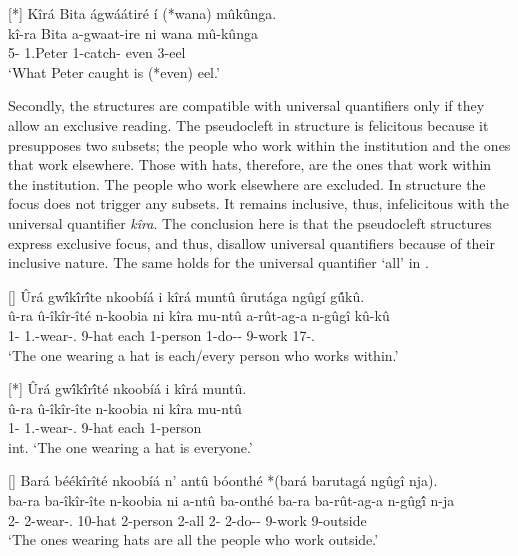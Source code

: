 \documentclass[output=paper]{langscibook}
\begin{document}
\ex
[*]{
\label{bkm:Ref111981565}
Kîrá Bita ágwáátiré í (*wana) mûkûnga.\\
\gll
kî-ra  Bita  a-gwaat-ire  ni  wana  mû-kûnga\\
5-\RM{} 1.Peter 1\SM{}-catch-\PFV{}  \COP{} even  3-eel\\
\glt
`What Peter caught is (*even) eel.’
}

\z


Secondly, the structures are compatible with universal quantifiers only if they allow an exclusive reading. The pseudocleft in structure  is felicitous because it presupposes two subsets; the people who work within the institution and the ones that work elsewhere. Those with hats, therefore, are the ones that work within the institution. The people who work elsewhere are excluded. In structure  the focus does not trigger any subsets. It remains inclusive, thus, infelicitous with the universal quantifier \textit{kîra}. The conclusion here is that the pseudocleft structures express exclusive focus, and thus, disallow universal quantifiers because of their inclusive nature. The same holds for the universal quantifier ‘all’ in .

\ea
[]{
\label{bkm:Ref111709098}
Ûrá gw\'{î}k\'{î}r\'{î}te nkoobíá i kîrá muntû ûrutága ngûgí g\'{û}kû.\\
\gll
û-ra  û-îkîr-îté  n-koobia  ni  kîra  mu-ntû  a-rût-ag-a  n-gûgî  kû-kû\\
1-\RM{} 1\SM.\REL{}-wear-\STAT.\PFV{} 9-hat \COP{} each  1-person 1\SM{}-do-\HAB{}-\FV{} 9-work  17-\DEM.\PROX{}\\
\glt
‘The one wearing a hat is each/every person who works within.’
}

\ex
[*]{
\label{bkm:Ref111709106}
Ûrá gw\'{î}k\'{î}r\'{î}té nkoobíá i kîrá muntû.\\
\gll
û-ra  û-îkîr-îte  n-koobia  ni  kîra  mu-ntû\\
1-\RM{} 1\SM.\REL{}-wear-\STAT.\PFV{} 9-hat \COP{} each  1-person\\
\glt
int. ‘The one wearing a hat is everyone.’
}


\ex
[]{
\label{bkm:Ref111709046}
Bará béékîrîté nkoobíá n’ antû bóonthé *(bará barutagá ngûgî nja).\\
\gll
ba-ra  ba-îkîr-îte  n-koobia  ni  a-ntû  ba-onthé   ba-ra  ba-rût-ag-a  n-gûg\'{î}  n-ja \\
2-\RM{} 2-wear-\STAT.\PFV{} 10-hat \COP{}  2-person  2-all 2- \RM{} 2-do-\HAB-\FV{} 9-work  9-outside \\
\glt
‘The ones wearing hats are all the people who work outside.’
}
\end{document}
